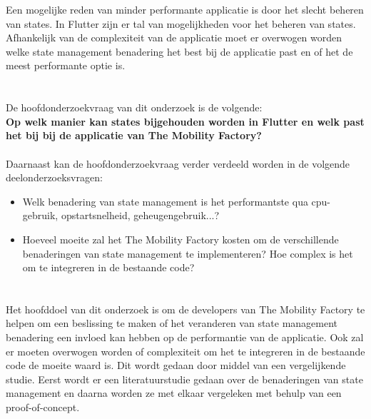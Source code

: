 Een mogelijke reden van minder performante applicatie is door het slecht beheren van states. In Flutter zijn er tal van mogelijkheden voor het beheren van states. Afhankelijk van de complexiteit van de applicatie moet er overwogen worden welke state management benadering het best bij de applicatie past en of het de meest performante optie is.

\section{}%
\label{sec:onderzoeksvraag}

De hoofdonderzoekvraag van dit onderzoek is de volgende:
\\
\textbf{Op welk manier kan states bijgehouden worden in Flutter en welk past het bij bij de applicatie van The Mobility Factory?}
\\
\\
Daarnaast kan de hoofdonderzoekvraag verder verdeeld worden in de volgende deelonderzoeksvragen:
\begin{itemize}
  \item Welk benadering van state management is het performantste qua cpu-gebruik, opstartsnelheid, geheugengebruik...?
  \item Hoeveel moeite zal het The Mobility Factory kosten om de verschillende benaderingen van state management te implementeren? Hoe complex is het om te integreren in de bestaande code?
\end{itemize}

\section{}%
\label{sec:onderzoeksdoelstelling}

Het hoofddoel van dit onderzoek is om de developers van The Mobility Factory te helpen om een beslissing te maken of het veranderen van state management benadering een invloed kan hebben op de performantie van de applicatie. Ook zal er moeten overwogen worden of complexiteit om het te integreren in de bestaande code de moeite waard is. Dit wordt gedaan door middel van een vergelijkende studie. Eerst wordt er een literatuurstudie gedaan over de benaderingen van state management en daarna worden ze met elkaar vergeleken met behulp van een proof-of-concept.

\section{}%
\label{sec:opzet-bachelorproef}

